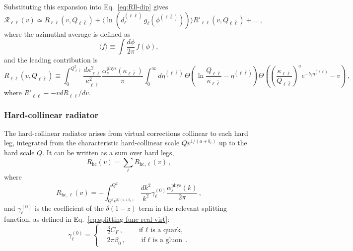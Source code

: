 Substituting this expansion into Eq.~\eqref{eq:Rll-dip} gives
\begin{equation}
\label{eq:R-ll-expan}
 \mathcal{R}_{\ell\bar\ell}(v)\simeq
R_{\ell\bar \ell}\left(v,Q_{\ell\bar \ell}\right)+\langle \ln(d^{(\ell\bar \ell)}_\ell\,g_\ell(\phi^{(\ell\bar{\ell})}))\rangle R'_{\ell\bar \ell}\left(v,Q_{\ell\bar \ell}\right)+\dots\,,
\end{equation}
where the azimuthal average is defined as
\begin{equation}
\label{eq:azimuthal-average}
\langle f\rangle
\equiv
\int\frac{d\phi}{2\pi}\,f(\phi),
\end{equation}
and the leading contribution is
\begin{equation}
  \label{eq:Rll-final}
  R_{\ell\bar \ell}(v,Q_{\ell\bar \ell})\equiv \int_0^{Q^2_{\ell\bar \ell}} \frac{d\kappa_{\ell\bar\ell}^2}{\kappa_{\ell\bar\ell}^2} \frac{\alpha^{\mathrm{phys}}_s(\kappa_{\ell\bar\ell})}{\pi} \int_0^\infty\!\! d\eta^{(\ell\bar\ell)}\, \Theta\!\left(\ln\frac{Q_{\ell\bar\ell}}{\kappa_{\ell\bar\ell}}-\eta^{(\ell\bar\ell)}\right)\Theta\left(
      \left(\frac{\kappa_{\ell\bar\ell}}{Q_{\ell\bar \ell}}\right)^a e^{-b_\ell\eta^{(\ell\bar\ell)}}-v
    \right) \,,
\end{equation}
where  $R'_{\ell\bar\ell}\equiv -v dR_{\ell\bar\ell}/dv$.

\subsubsection{Hard-collinear radiator}

The hard-collinear radiator arises from virtual corrections collinear to
each hard leg, integrated from the characteristic hard-collinear scale
$Qv^{1/(a+b_\ell)}$ up to the hard scale $Q$. It can be written as a sum over hard legs,
\begin{equation}
R_{\mathrm{hc}}(v)=\sum_\ell R_{\mathrm{hc},\ell}(v)\,,
\end{equation}
where
\begin{equation}
\label{eq:Rhc-NLL}
	R_{\mathrm{hc},\ell}(v)=-\int_{Q^2 v^{2/(a+b_\ell)}}^{Q^2}\frac{dk^2}{k^2}\gamma_\ell^{(0)}\frac{\alpha_s^{\mathrm{phys}}(k)}{2\pi}\,,
\end{equation}
and $\gamma_\ell^{(0)}$ is the coefficient of the $\delta(1-z)$
term in the relevant splitting function, as defined in
Eq.~\eqref{eq:splitting-func-real-virt}: 
 \begin{equation}
  \label{eq:gammal-flav}
  \gamma_\ell^{(0)} = \left\{
    \begin{split}
      & \frac{3}{2}C_F\,,\qquad\text{if $\ell$ is a quark,} \\
      & 2\pi \beta_0 \,,\qquad\text{if $\ell$ is a gluon}\,.
    \end{split}
    \right.
\end{equation}

